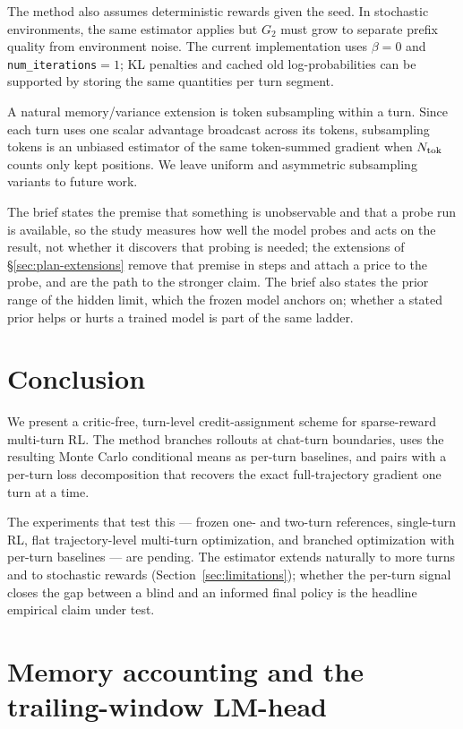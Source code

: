 \documentclass[11pt,a4paper]{article}
\begin{document}
The method also assumes deterministic rewards given the seed. In stochastic environments, the same estimator applies but $G_2$ must grow to separate prefix quality from environment noise. The current implementation uses $\beta=0$ and \texttt{num\_iterations}$=1$; KL penalties and cached old log-probabilities can be supported by storing the same quantities per turn segment.

A natural memory/variance extension is token subsampling within a turn. Since each turn uses one scalar advantage broadcast across its tokens, subsampling tokens is an unbiased estimator of the same token-summed gradient when $N_{\rm tok}$ counts only kept positions. We leave uniform and asymmetric subsampling variants to future work.

The brief states the premise that something is unobservable and that a probe run is available, so the study measures how well the model probes and acts on the result, not whether it discovers that probing is needed; the extensions of \S\ref{sec:plan-extensions} remove that premise in steps and attach a price to the probe, and are the path to the stronger claim. The brief also states the prior range of the hidden limit, which the frozen model anchors on; whether a stated prior helps or hurts a trained model is part of the same ladder.

\section{Conclusion}

We present a critic-free, turn-level credit-assignment scheme for sparse-reward multi-turn RL. The method branches rollouts at chat-turn boundaries, uses the resulting Monte Carlo conditional means as per-turn baselines, and pairs with a per-turn loss decomposition that recovers the exact full-trajectory gradient one turn at a time.

The experiments that test this --- frozen one- and two-turn references, single-turn RL, flat trajectory-level multi-turn optimization, and branched optimization with per-turn baselines --- are pending. The estimator extends naturally to more turns and to stochastic rewards (Section~\ref{sec:limitations}); whether the per-turn signal closes the gap between a blind and an informed final policy is the headline empirical claim under test.

\appendix

\section{Memory accounting and the trailing-window LM-head}
\label{app:memory}
\end{document}
